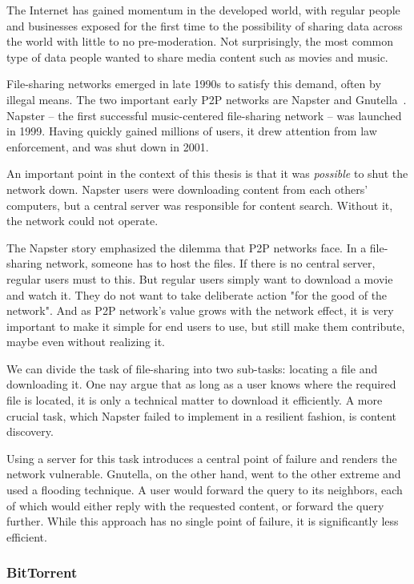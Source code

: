 The Internet has gained momentum in the developed world, with regular people and businesses exposed for the first time to the possibility of sharing data across the world with little to no pre-moderation.
Not surprisingly, the most common type of data people wanted to share media content such as movies and music.

File-sharing networks emerged in late 1990s to satisfy this demand, often by illegal means.
The two important early P2P networks are Napster and Gnutella~\cite{Gummadi2002}.
Napster -- the first successful music-centered file-sharing network -- was launched in 1999.
Having quickly gained millions of users, it drew attention from law enforcement, and was shut down in 2001.

An important point in the context of this thesis is that it was \textit{possible} to shut the network down.
Napster users were downloading content from each others' computers, but a central server was responsible for content search.
Without it, the network could not operate.

The Napster story emphasized the dilemma that P2P networks face.
In a file-sharing network, someone has to host the files.
If there is no central server, regular users must to this.
But regular users simply want to download a movie and watch it.
They do not want to take deliberate action "for the good of the network".
And as P2P network's value grows with the network effect, it is very important to make it simple for end users to use, but still make them contribute, maybe even without realizing it.

We can divide the task of file-sharing into two sub-tasks: locating a file and downloading it.
One nay argue that as long as a user knows where the required file is located, it is only a technical matter to download it efficiently.
A more crucial task, which Napster failed to implement in a resilient fashion, is content discovery.

Using a server for this task introduces a central point of failure and renders the network vulnerable.
Gnutella, on the other hand, went to the other extreme and used a flooding technique.
A user would forward the query to its neighbors, each of which would either reply with the requested content, or forward the query further.
While this approach has no single point of failure, it is significantly less efficient.


\subsubsection{BitTorrent}

